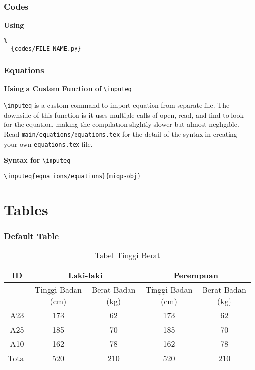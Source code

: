 \documentclass{beamer}
\begin{document}
\begin{frame}[fragile]
  \frametitle{Codes}

  \textbf{Using} \verb||

  \begin{block}{}
    \vspace{-2em}
    \small
    \begin{verbatim}
%
  {codes/FILE_NAME.py}
    \end{verbatim}
  \end{block}

\end{frame}

\begin{frame}[fragile]
  \frametitle{Equations}

  \textbf{Using a Custom Function of} \verb|\inputeq|

  \verb|\inputeq| is a custom command to import equation from separate file. The downside of this function is it uses multiple calls of open, read, and find to look for the equation, making the compilation slightly slower but almost negligible. Read \texttt{main/equations/equations.tex} for the detail of the syntax in creating your own \texttt{equations.tex} file.

  \textbf{Syntax for} \verb|\inputeq|

  \begin{block}{}
    \vspace{-2em}
    \small
    \begin{verbatim}
\inputeq{equations/equations}{miqp-obj}
    \end{verbatim}
  \end{block}

\end{frame}

\section{Tables}
\begin{frame}
  \frametitle{Default Table}

  \begin{table}[h]
    \centering
    \caption{Tabel Tinggi Berat}
    \begin{tabular}{|c|c|c|c|c}
      \hline
      ID & \multicolumn{2}{c}{Laki-laki} & \multicolumn{2}{c}{Perempuan} \\
      \hline
       & Tinggi Badan (cm) & Berat Badan (kg) & Tinggi Badan (cm) & Berat Badan (kg) \\
      \hline
      A23   & 173 & 62  & 173 & 62 \\ \hline
      A25   & 185 & 70  & 185 & 70 \\ \hline
      A10   & 162 & 78  & 162 & 78 \\ \hline
      Total & 520 & 210 & 520 & 210 \\ \hline
    \end{tabular}
    \label{tab:tinggiberat}
  \end{table}
\end{frame}
\end{document}
